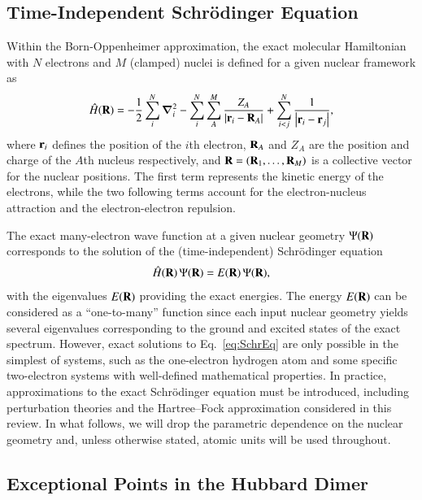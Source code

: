 \documentclass[aps,prb,reprint,noshowkeys,superscriptaddress]{revtex4-1}
\newcommand{\Ne}{N} %
\newcommand{\Nn}{M} %
\newcommand{\hH}{\Hat{H}}
\begin{document}
\subsection{Time-Independent Schr\"odinger Equation}
\label{sec:TDSE}
Within the Born-Oppenheimer approximation, the exact molecular Hamiltonian with $\Ne$ electrons and 
$\Nn$ (clamped) nuclei is defined for a given nuclear framework as
\begin{equation}\label{eq:ExactHamiltonian}
    \hH(\vb{R}) = 
    - \frac{1}{2} \sum_{i}^{\Ne} \grad_i^2 
    - \sum_{i}^{\Ne} \sum_{A}^{\Nn} \frac{Z_A}{\abs{\vb{r}_i-\vb{R}_A}} 
    + \sum_{i<j}^{\Ne}\frac{1}{\abs{\vb{r}_i-\vb{r}_j}},
\end{equation}
where $\vb{r}_i$ defines the position of the $i$th electron, $\vb{R}_{A}$ and $Z_{A}$ are the position
and charge of the $A$th nucleus respectively, and $\vb{R} = (\vb{R}_{1}, \dots, \vb{R}_{\Nn})$ is a
collective vector for the nuclear positions.
The first term represents the kinetic energy of the electrons, while 
the two following terms account for the electron-nucleus attraction and the electron-electron repulsion.

The exact many-electron wave function at a given nuclear geometry $\Psi(\vb{R})$ corresponds 
to the solution of the (time-independent) Schr\"{o}dinger equation
\begin{equation} 
    \hH(\vb{R})\, \Psi(\vb{R}) = E(\vb{R})\, \Psi(\vb{R}),
    \label{eq:SchrEq}
\end{equation} 
with the eigenvalues $E(\vb{R})$ providing the exact energies.
The energy $E(\vb{R})$ can be considered as a ``one-to-many'' function since each input nuclear geometry
yields several eigenvalues corresponding to the ground and excited states of the exact spectrum.
However, exact solutions to Eq.~\eqref{eq:SchrEq} are only possible in the simplest of systems, such as 
the one-electron hydrogen atom and some specific two-electron systems with well-defined mathematical 
properties.\cite{Taut_1993,Loos_2009b,Loos_2010e,Loos_2012}
In practice, approximations to the exact Schr\"{o}dinger equation must be introduced, including
perturbation theories and the Hartree--Fock approximation considered in this review.
In what follows, we will drop the parametric dependence on the nuclear geometry and, 
unless otherwise stated, atomic units will be used throughout.

\subsection{Exceptional Points in the Hubbard Dimer}
\label{sec:example}
\end{document}
